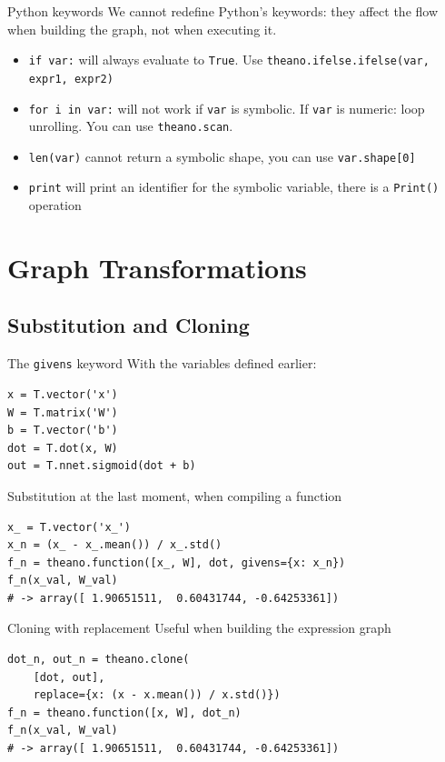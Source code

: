\documentclass[a4paper,9pt]{beamer}
\begin{document}
\begin{frame}[fragile]{Python keywords}
  We cannot redefine Python's keywords: they affect the flow when building the graph, not when executing it.
  \begin{itemize}
    \item \verb|if var:| will always evaluate to \verb|True|.
      Use \verb|theano.ifelse.ifelse(var, expr1, expr2)|
    \item \verb|for i in var:| will not work if \verb|var| is symbolic.
      If \verb|var| is numeric: loop unrolling. You can use \verb|theano.scan|.
    \item \verb|len(var)| cannot return a symbolic shape, you can use
      \verb|var.shape[0]|
    \item \verb|print| will print an identifier for the symbolic variable,
      there is a \verb|Print()| operation
  \end{itemize}
\end{frame}


\section{Graph Transformations}
\begin{frame}
  \tableofcontents[currentsection]
\end{frame}

\subsection{Substitution and Cloning}
\begin{frame}[fragile]{The {\tt givens} keyword}
  With the variables defined earlier:
  \begin{verbatim}
x = T.vector('x')
W = T.matrix('W')
b = T.vector('b')
dot = T.dot(x, W)
out = T.nnet.sigmoid(dot + b)
  \end{verbatim}

  Substitution at the last moment, when compiling a function
  \begin{verbatim}
x_ = T.vector('x_')
x_n = (x_ - x_.mean()) / x_.std()
f_n = theano.function([x_, W], dot, givens={x: x_n})
f_n(x_val, W_val)
# -> array([ 1.90651511,  0.60431744, -0.64253361])
  \end{verbatim}
\end{frame}

\begin{frame}[fragile]{Cloning with replacement}
  Useful when building the expression graph
  \begin{verbatim}
dot_n, out_n = theano.clone(
    [dot, out],
    replace={x: (x - x.mean()) / x.std()})
f_n = theano.function([x, W], dot_n)
f_n(x_val, W_val)
# -> array([ 1.90651511,  0.60431744, -0.64253361])
  \end{verbatim}
\end{frame}
\end{document}

